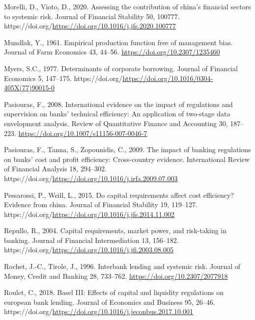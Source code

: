\documentclass[
  12pt,
  a4paper,
  DIV=11,
  numbers=noendperiod]{scrreprt}
\newlength{\cslhangindent}
\newenvironment{CSLReferences}[2] %
 {\begin{list}{}{%
  \setlength{\itemindent}{0pt}
  \setlength{\leftmargin}{0pt}
  \setlength{\parsep}{0pt}
  \ifodd #1
   \setlength{\leftmargin}{\cslhangindent}
   \setlength{\itemindent}{-1\cslhangindent}
  \fi
  \setlength{\itemsep}{#2\baselineskip}}}
 {\end{list}}
\begin{document}
\begin{CSLReferences}{1}{0}
Morelli, D., Vioto, D., 2020. Assessing the contribution of china's
financial sectors to systemic risk. Journal of Financial Stability 50,
100777. https://doi.org/\url{https://doi.org/10.1016/j.jfs.2020.100777}

Mundlak, Y., 1961. Empirical production function free of management
bias. Journal of Farm Economics 43, 44--56.
\url{https://doi.org/10.2307/1235460}

Myers, S.C., 1977. Determinants of corporate borrowing. Journal of
Financial Economics 5, 147--175.
https://doi.org/\url{https://doi.org/10.1016/0304-405X(77)90015-0}

Pasiouras, F., 2008. International evidence on the impact of regulations
and supervision on banks' technical efficiency: An application of
two-stage data envelopment analysis. Review of Quantitative Finance and
Accounting 30, 187--223. \url{https://doi.org/10.1007/s11156-007-0046-7}

Pasiouras, F., Tanna, S., Zopounidis, C., 2009. The impact of banking
regulations on banks' cost and profit efficiency: Cross-country
evidence. International Review of Financial Analysis 18, 294--302.
https://doi.org/\url{https://doi.org/10.1016/j.irfa.2009.07.003}

Pessarossi, P., Weill, L., 2015. Do capital requirements affect cost
efficiency? Evidence from china. Journal of Financial Stability 19,
119--127.
https://doi.org/\url{https://doi.org/10.1016/j.jfs.2014.11.002}

Repullo, R., 2004. Capital requirements, market power, and risk-taking
in banking. Journal of Financial Intermediation 13, 156--182.
https://doi.org/\url{https://doi.org/10.1016/j.jfi.2003.08.005}

Rochet, J.-C., Tirole, J., 1996. Interbank lending and systemic risk.
Journal of Money, Credit and Banking 28, 733--762.
\url{https://doi.org/10.2307/2077918}

Roulet, C., 2018. Basel III: Effects of capital and liquidity
regulations on european bank lending. Journal of Economics and Business
95, 26--46.
https://doi.org/\url{https://doi.org/10.1016/j.jeconbus.2017.10.001}


\end{CSLReferences}
\end{document}
